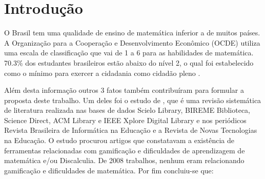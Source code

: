 \chapter[Introdução]{Introdução}

\begin{comment}
Tendo em vista que já é difícil para alunos aprenderem matemática, a dificuldade só aumenta quando fala-se de alunos com Transtorno do Déficit de Atenção com Hiperatividade (TDAH) inseridos no contexto de faculdade, onde a desatenção aumenta, já que professores não estão preparados e precisam renovar seus métodos para atrair atenção dos alunos para ensinar a matéria e ainda fazer disso algo divertido para fazer com que o foco seja maior ainda. Já que aprender brincando gera melhores resultados. Segundo (Russel A. Barkley, PhD. p. iv) quem possui TDAH têm mais dificuldades que pessoas normais em ambientes que exijam mais foco, objetividade e autocontrole. Também é dito que as características principais de TDAH podem trazer diversas dificuldades no contexto escolar (George J. DuPaul, PhD e Gary Stoner, PhD. p.4).

De acordo com (George J. DuPaul, PhD e Gary Stoner, PhD. p.4) o TDAH comparado a outros problemas como autismo e depressão é um transtorno de alta incidência e se mostra presente principalmente em meninos. Por isso o foco deste estudo também será em estudantes com TDAH.
\end{comment}

O Brasil tem uma qualidade de ensino de matemática inferior a de muitos países. A Organização para a Cooperação e Desenvolvimento Econômico (OCDE) utiliza uma escala de classificação que vai de 1 a 6 para as habilidades de matemática. 70.3\% dos estudantes brasileiros estão abaixo do nível 2, o qual foi estabelecido como o mínimo para exercer a cidadania como cidadão pleno \cite{inep2015nivelcidadania}. 

Além desta informação outros 3 fatos também contribuíram para formular a proposta deste trabalho. Um deles foi o estudo de \cite{revbibmatgam}, que é uma revisão sistemática de literatura realizada nas bases de dados Scielo Library, BIREME Biblioteca, Science Direct, ACM Library e IEEE Xplore Digital Library e nos periódicos Revista Brasileira de Informática na Educação e a Revista de Novas Tecnologias na Educação. O estudo procurou artigos que constatavam a existência de ferramentas relacionadas com gamificação e dificuldades de aprendizagem de matemática e/ou Discalculia. De 2008 trabalhos, nenhum eram relacionando gamificação e dificuldades de matemática. Por fim concluiu-se que:

